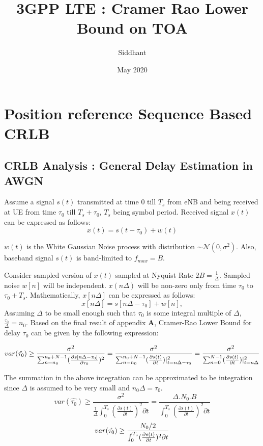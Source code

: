 \documentclass{article}
\title{\LARGE 3GPP LTE : Cramer Rao Lower Bound on TOA}
\author{Siddhant}
\date{May 2020}
\begin{document}
\maketitle
\section{\LARGE Position reference Sequence Based CRLB}

\subsection{CRLB Analysis : General Delay Estimation in AWGN}
Assume a signal $s(t)$ transmitted at time $0$ till $T_s$ from eNB and being received at UE from time $\tau_0$ till $T_s+\tau_0$, $T_s$ being symbol period. Received signal $x(t)$ can be expressed as follows:
$$x(t) = s(t - \tau_0) + w(t)$$

$w(t)$ is the White Gaussian Noise process with distribution $\sim \mathcal N (0, \sigma^2)$. Also, baseband signal $s(t)$ is band-limited to $f_{max}=B$.

Consider sampled version of $x(t)$ sampled at Nyquist Rate $2B = \frac{1}{\Delta}$. Sampled noise $w[n]$ will be independent. $x(n\Delta)$ will be non-zero only from time $\tau_0$ to $\tau_0 + T_s$. Mathematically, $x[n\Delta]$ can be expressed as follows:
$$x[n\Delta] = s[n\Delta - \tau_0] + w[n],$$
Assuming $\Delta$ to be small enough such that $\tau_0$ is some integral multiple of $\Delta$, $\frac{\tau_0}{\Delta} = n_0$.
Based on the final result of appendix $\mathbf{A}$, Cramer-Rao Lower Bound for delay $\tau_0$ can be given by the following expression:

\begin{equation} \label{eq1} \large
var(\hat{\tau_0}) \ge \frac{\sigma^2}{\sum^{n_0+N-1}_{n=n_0}(\frac{\partial s[n\Delta - \tau_0]}{\partial \tau_0 })^2} = \frac{\sigma^2}{\sum^{n_0+N-1}_{n=n_0}(\frac{\partial s(t)}{\partial t})| ^2 _{t=n\Delta - \tau_0}} = \frac{\sigma^2}{\sum^{N-1}_{n=0}(\frac{\partial s(t)}{\partial t})| ^2 _{t=n\Delta}}
\end{equation}

The summation in the above integration can be approximated to be integration since $\Delta$ is assumed to be very small and $n_0\Delta = \tau_0$. 
$$var(\hat{\tau_0}) \ge \frac{\sigma^2}{\frac{1}{\Delta} \int^{T_s}_{0}(\frac{\partial s(t)}{\partial t})^2 \partial t} = \frac{\Delta. N_0.B}{\int^{T_s}_{0}(\frac{\partial s(t)}{\partial t})^2 \partial t}$$
\begin{equation} \label{eq2} \large
var(\hat{\tau_0}) \ge \frac{N_0/2}{\int^{T_s}_{0}(\frac{\partial s(t)}{\partial t})^2 \partial t}
\end{equation}
\end{document}
